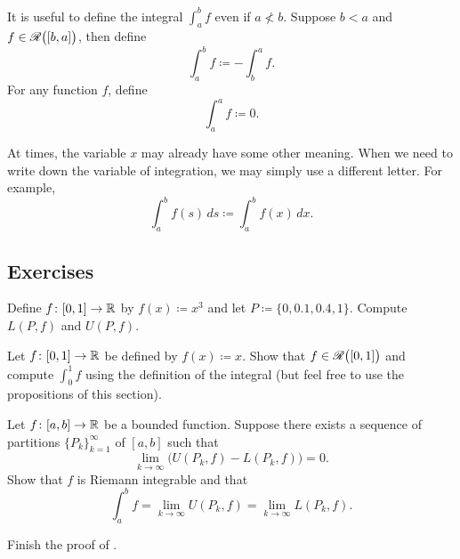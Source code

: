 It is useful to define the integral $\int_a^b f$ even if
$a \not< b$.  Suppose $b < a$ and $f \in {\mathscr{R}}\bigl([b,a]\bigr)$,
then define
\begin{equation*}
\int_a^b f \coloneqq - \int_b^a f .
\end{equation*}
For any function $f$, define
\begin{equation*}
\int_a^a f \coloneqq 0 .
\end{equation*}

At times, the variable $x$ may already have some other meaning.  When
we need to write down the variable of integration, we may simply
use a different letter.  For example,
\begin{equation*}
\int_a^b f(s)\,ds \coloneqq \int_a^b f(x)\,dx .
\end{equation*}

\subsection{Exercises}

\begin{exercise}
Define $f \colon [0,1] \to {\mathbb{R}}$ by $f(x) \coloneqq x^3$
and let $P \coloneqq \{ 0, 0.1, 0.4, 1 \}$.  Compute $L(P,f)$ and $U(P,f)$.
\end{exercise}

\begin{exercise}
Let $f \colon [0,1] \to {\mathbb{R}}$ be defined by $f(x) \coloneqq x$.
Show that $f \in {\mathscr{R}}\bigl([0,1]\bigr)$ and
compute $\int_0^1 f$ using the definition of the integral
(but
feel free to use the propositions of this section).%
\end{exercise}

\begin{exercise}
Let $f \colon [a,b] \to {\mathbb{R}}$ be a bounded function.
Suppose there exists a sequence of partitions $\{ P_k \}_{k=1}^\infty$ of $[a,b]$
such that
\begin{equation*}
\lim_{k \to \infty} \bigl( U(P_k,f) - L(P_k,f) \bigr) = 0 .
\end{equation*}
Show that $f$ is Riemann integrable and that
\begin{equation*}
\int_a^b f = 
\lim_{k \to \infty} U(P_k,f)
=
\lim_{k \to \infty} L(P_k,f) .
\end{equation*}
\end{exercise}

\begin{exercise}
Finish the proof of .
\end{exercise}

